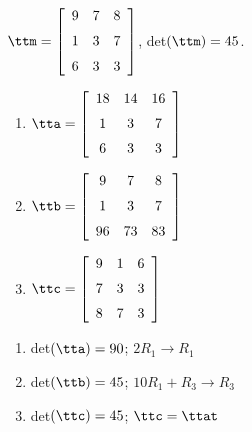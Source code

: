 {$\ttm=\left[ \begin {array}{ccc} 9&7&8\\\noalign{\medskip}1&3&7
\\\noalign{\medskip}6&3&3\end {array} \right] $,
 \quad
 det$(\ttm)=45$.
\begin{enumerate}
\item $\tta = \left[ \begin {array}{ccc} 18&14&16\\\noalign{\medskip}1&3&7
\\\noalign{\medskip}6&3&3\end {array} \right]$
\item	$\ttb = \left[ \begin {array}{ccc} 9&7&8\\\noalign{\medskip}1&3&7
\\\noalign{\medskip}96&73&83\end {array} \right]$
\item	$\ttc = \left[ \begin {array}{ccc} 9&1&6\\\noalign{\medskip}7&3&3
\\\noalign{\medskip}8&7&3\end {array} \right] $
\end{enumerate}} 
{\begin{enumerate}
\item det$(\tta) = 90$; $2R_1\rightarrow R_1$
\item det$(\ttb) = 45$; $10R_1+R_3\rightarrow R_3$
\item det$(\ttc) = 45$; $\ttc = \ttat$
\end{enumerate}}



  

